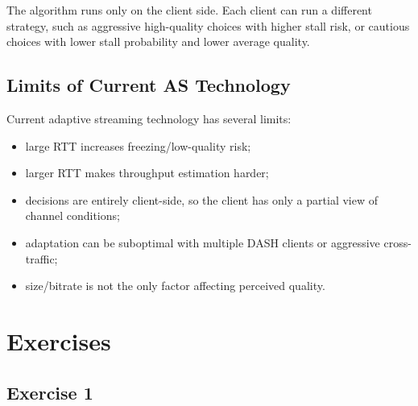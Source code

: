 The algorithm runs only on the client side. Each client can run a different strategy, such as aggressive high-quality choices with higher stall risk, or cautious choices with lower stall probability and lower average quality.

\subsection{Limits of Current AS Technology}

Current adaptive streaming technology has several limits:

\begin{itemize}
\item large RTT increases freezing/low-quality risk;
\item larger RTT makes throughput estimation harder;
\item decisions are entirely client-side, so the client has only a partial view of channel conditions;
\item adaptation can be suboptimal with multiple DASH clients or aggressive cross-traffic;
\item size/bitrate is not the only factor affecting perceived quality.
\end{itemize}

\section{Exercises}

\subsection{Exercise 1}


